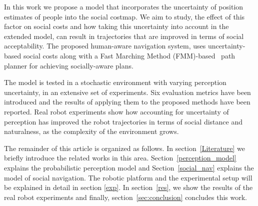 In this work we propose a model that incorporates the uncertainty of position estimates of people into the social costmap. We aim to study, the effect of this factor on social costs and how taking this uncertainty into account in the extended model, can result in trajectories that are improved in terms of social acceptability. The proposed human-aware navigation system, uses uncertainty-based social costs along with a Fast Marching Method (FMM)-based~\cite{sethian1999fast} path planner for achieving socially-aware plans. 


The model is tested in a stochastic environment with varying perception uncertainty, in an extensive set of experiments. Six evaluation metrics have been introduced and the results of applying them to the proposed methods have been reported. Real robot experiments show how accounting for uncertainty of perception has improved the robot trajectories in terms of social distance and naturalness, as the complexity of the environment grows.

The remainder of this article is organized as follows. In section~\ref{Literature} we briefly introduce the related works in this area. Section~\ref{perception_model} explains the probabilistic perception model and Section~\ref{social_nav} explains the model of social navigation. The robotic platform 
and the experimental setup will be explained in detail in section \ref{exp}. In section~\ref{res}, we show the results of the real robot experiments and finally, section~\ref{sec:conclusion} concludes this work.







